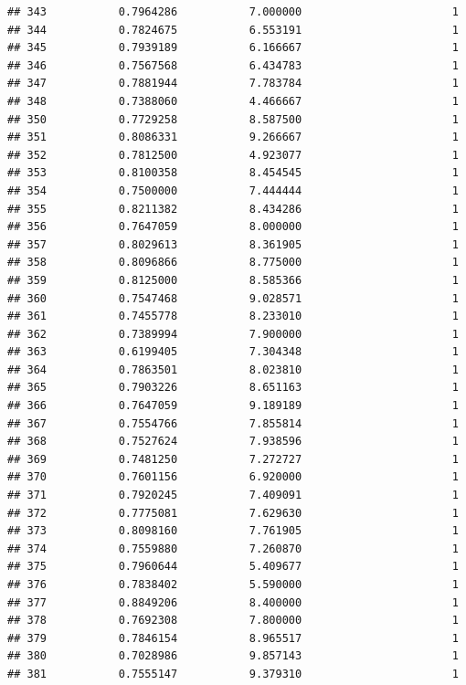 \documentclass[]{article}
\begin{document}
\begin{verbatim}
## 343           0.7964286           7.000000                       1
## 344           0.7824675           6.553191                       1
## 345           0.7939189           6.166667                       1
## 346           0.7567568           6.434783                       1
## 347           0.7881944           7.783784                       1
## 348           0.7388060           4.466667                       1
## 350           0.7729258           8.587500                       1
## 351           0.8086331           9.266667                       1
## 352           0.7812500           4.923077                       1
## 353           0.8100358           8.454545                       1
## 354           0.7500000           7.444444                       1
## 355           0.8211382           8.434286                       1
## 356           0.7647059           8.000000                       1
## 357           0.8029613           8.361905                       1
## 358           0.8096866           8.775000                       1
## 359           0.8125000           8.585366                       1
## 360           0.7547468           9.028571                       1
## 361           0.7455778           8.233010                       1
## 362           0.7389994           7.900000                       1
## 363           0.6199405           7.304348                       1
## 364           0.7863501           8.023810                       1
## 365           0.7903226           8.651163                       1
## 366           0.7647059           9.189189                       1
## 367           0.7554766           7.855814                       1
## 368           0.7527624           7.938596                       1
## 369           0.7481250           7.272727                       1
## 370           0.7601156           6.920000                       1
## 371           0.7920245           7.409091                       1
## 372           0.7775081           7.629630                       1
## 373           0.8098160           7.761905                       1
## 374           0.7559880           7.260870                       1
## 375           0.7960644           5.409677                       1
## 376           0.7838402           5.590000                       1
## 377           0.8849206           8.400000                       1
## 378           0.7692308           7.800000                       1
## 379           0.7846154           8.965517                       1
## 380           0.7028986           9.857143                       1
## 381           0.7555147           9.379310                       1

\end{verbatim}
\end{document}

